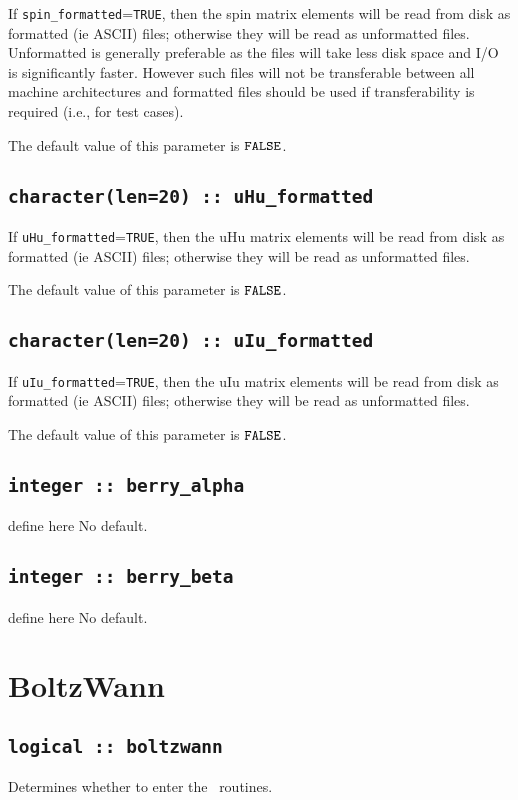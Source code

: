 If \verb#spin_formatted#=\verb#TRUE#, then the spin matrix elements will be
read from disk as formatted (ie ASCII) files; otherwise they will be
read as unformatted files. Unformatted is generally preferable as the
files will take less disk space and I/O is significantly
faster. However such files will not be transferable between all
machine architectures and formatted files should be used if
transferability is required (i.e., for test cases).

The default value of this parameter is $\verb#FALSE#$.

\subsection[uHu\_formated]{\tt character(len=20) :: uHu\_formatted}

If \verb#uHu_formatted#=\verb#TRUE#, then the uHu matrix elements will be
read from disk as formatted (ie ASCII) files; otherwise they will be
read as unformatted files.

The default value of this parameter is $\verb#FALSE#$.

\subsection[uIu\_formated]{\tt character(len=20) :: uIu\_formatted}

If \verb#uIu_formatted#=\verb#TRUE#, then the uIu matrix elements will be
read from disk as formatted (ie ASCII) files; otherwise they will be
read as unformatted files.

The default value of this parameter is $\verb#FALSE#$.

\subsection[berry\_alpha]{\tt integer :: berry\_alpha}
define here
No default.

\subsection[berry\_alpha]{\tt integer :: berry\_beta}
define here
No default.




\clearpage
\section{BoltzWann}
\subsection[boltzwann]{\tt logical :: boltzwann}
Determines whether to enter the \bw\ routines.

